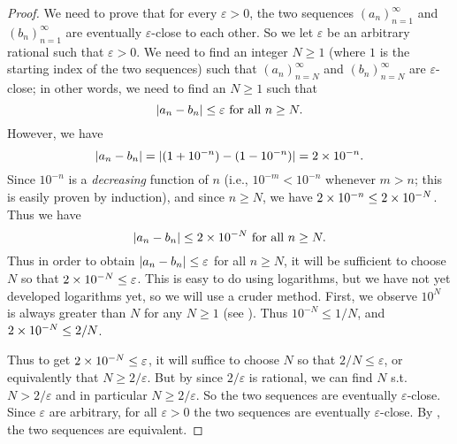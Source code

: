 \begin{proof}
We need to prove that for every \(\varepsilon > 0\), the two sequences \((a_n)_{n = 1}^{\infty}\) and \((b_n)_{n = 1}^{\infty}\) are eventually \(\varepsilon\)-close to each other.
So we let \(\varepsilon\) be an arbitrary rational such that \(\varepsilon > 0\).
We need to find an integer \(N \ge 1\) (where \(1\) is the starting index of the two sequences) such that \((a_n)_{n = N}^{\infty}\) and \((b_n)_{n = N}^{\infty}\) are \(\varepsilon\)-close;
in other words, we need to find an \(N \ge 1\) such that
\[
    \lvert a_n - b_n\rvert \le \varepsilon \text{ for all } n \ge N.
\]
However, we have
\[
    \lvert a_n - b_n\rvert = \lvert(1 + 10^{-n}) - (1 - 10^{-n})\rvert = 2 \times 10^{-n}.
\]
Since \(10^{-n}\) is a \emph{decreasing} function of \(n\) (i.e., \(10^{-m} < 10^{-n}\) whenever \(m > n\);
this is easily proven by induction),
and since \(n \ge N\), we have \(2 \times 10^{-n} \le 2 \times 10^{-N}\).
Thus we have
\[
    \lvert a_n - b_n\rvert \le 2 \times 10^{-N} \text{ for all } n \ge N.
\]
Thus in order to obtain \(\lvert a_n - b_n\rvert \le \varepsilon\) for all \(n \ge N\), it will be sufficient to choose \(N\) so that \(2 \times 10^{-N} \le \varepsilon\).
This is easy to do using logarithms, but we have not yet developed logarithms yet, so we will use a cruder
method.
First, we observe \(10^N\) is always greater than \(N\) for any \(N \ge 1\) (see ).
Thus \(10^{-N} \le 1/N\), and \(2 \times 10^{-N} \le 2/N\).

Thus to get \(2 \times 10^{-N} \le \varepsilon\), it will suffice to choose \(N\) so that \(2/N \le \varepsilon\), or equivalently that \(N \ge 2/\varepsilon\).
But by  since \(2/\varepsilon\) is rational, we can find \(N\) s.t. \(N > 2/\varepsilon\) and in particular \(N \ge 2/\varepsilon\).
So the two sequences are eventually \(\varepsilon\)-close.
Since \(\varepsilon\) are arbitrary, for all \(\varepsilon > 0\) the two sequences are eventually \(\varepsilon\)-close.
By , the two sequences are equivalent.
\end{proof}


\exercisesection

